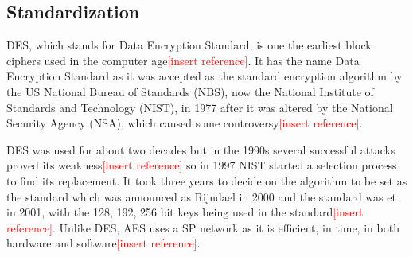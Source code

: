 \documentclass[12pt,twoside,a4paper]{report}
\begin{document}
    \subsection{Standardization}
    DES, which stands for Data Encryption Standard, is one the earliest block ciphers used in the computer age\textcolor{red}{[insert reference]}.
    It has the name Data Encryption Standard as it was accepted as the standard encryption algorithm by the US National Bureau of Standards (NBS), now the National Institute of Standards and Technology (NIST), in 1977 after it was altered by the National Security Agency (NSA), which caused some controversy\textcolor{red}{[insert reference]}.
    
    DES was used for about two decades but in the 1990s several successful attacks proved its weakness\textcolor{red}{[insert reference]} so in 1997 NIST started a selection process to find its replacement.
    It took three years to decide on the algorithm to be set as the standard which was announced as Rijndael in 2000 and the standard was et in 2001, with the 128, 192, 256 bit keys being used in the standard\textcolor{red}{[insert reference]}.
    Unlike DES, AES uses a SP network as it is efficient, in time, in both hardware and software\textcolor{red}{[insert reference]}.
    
\end{document}
